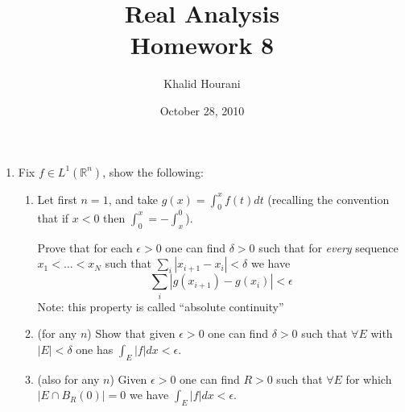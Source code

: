 \documentclass[12pt,leqno]{book}
\title{Real Analysis\\\large Homework 8}
\date{October 28, 2010}
\author{Khalid Hourani}
\theoremstyle{definition}
\newcommand{\R}{\mathbb{R}}
\begin{document}
\begin{titlepage}
 \maketitle 
\end{titlepage}

\begin{enumerate}
\item Fix $f\in L^1(\R^n)$, show the following:
  \begin{enumerate}
   \item Let first $n=1$, and take $g(x)=\int_0^xf(t)dt$ (recalling the convention that if $x<0$ then $\int_0^x=-\int_x^0$).
    
    Prove that for each $\epsilon>0$ one can find $\delta>0$ such that for \textit{every} sequence $x_1<\hdots<x_N$ such that $\displaystyle\sum_i|x_{i+1}-x_i|<\delta$ we have \[\sum_i|g(x_{i+1})-g(x_i)|<\epsilon\]
    Note: this property is called ``absolute continuity''
   \item (for any $n$) Show that given $\epsilon>0$ one can find $\delta>0$ such that $\forall E$ with $|E|<\delta$ one has $\int_E|f|dx<\epsilon$.
   \item (also for any $n$) Given $\epsilon>0$ one can find $R>0$ such that $\forall E$ for which $|E\cap B_R(0)|=0$ we have $\int_E|f|dx<\epsilon$.
  \end{enumerate}


\end{enumerate}
\end{document}

